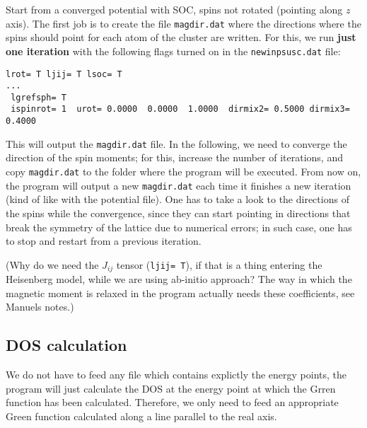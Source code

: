 \documentclass[a4paper,10pt,fullpage]{report}
\begin{document}
Start from a converged potential with SOC, spins not rotated (pointing along $z$ axis).
The first job is to create the file \verb|magdir.dat| where the directions where the spins
should point for each atom of the cluster are written.
For this, we run \textbf{just one iteration} with the following flags turned on
in the  \verb|newinpsusc.dat| file:
\begin{verbatim}
lrot= T ljij= T lsoc= T
...
 lgrefsph= T
 ispinrot= 1  urot= 0.0000  0.0000  1.0000  dirmix2= 0.5000 dirmix3= 0.4000
\end{verbatim}
This will output the \verb|magdir.dat| file. In the following, 
we need to converge the direction of the spin moments; for this, 
increase the number of iterations, and copy \verb|magdir.dat| to the folder 
where the program will be executed. 
From now on, the program will output a new \verb|magdir.dat| each time it finishes a new
iteration (kind of like with the potential file). One has to take a look
to the directions of the spins while the convergence, since they can start
pointing in directions that break the symmetry of the lattice due to
numerical errors; in such case, one has to stop and restart from a previous iteration.


(Why do we need the $J_{ij}$ tensor (\verb|ljij= T|), 
if that is a thing entering the Heisenberg model,
while we are using ab-initio approach? The way in which the magnetic moment
is relaxed in the program actually needs these coefficients, see Manuels notes.)

\subsection*{DOS calculation}

We do not have to feed any file which contains explictly the energy points, 
the program will just calculate the DOS at the energy point at which
the Grren function has been calculated. Therefore, we only need to feed an
appropriate Green function calculated along a line parallel to the real axis.
\end{document}
